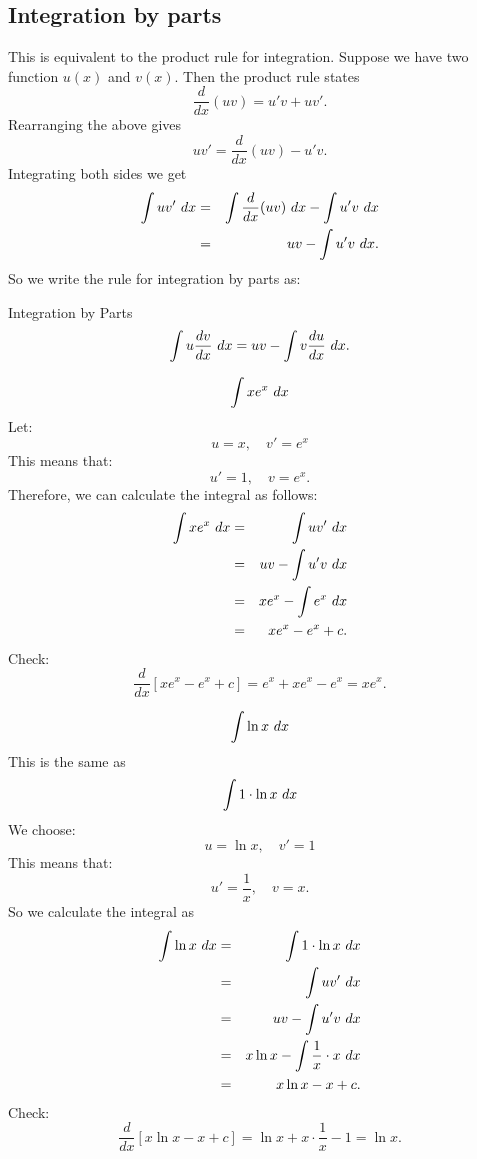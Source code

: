 \subsection{Integration by parts}
This is equivalent to the product rule for integration. Suppose we have two function $u(x)$ and $v(x)$. Then the product rule states
\[\frac{d}{dx}(uv)=u'v+uv'.\]
Rearranging the above gives
\[uv'=\frac{d}{dx}(uv)-u'v.\]
Integrating both sides we get
\begin{eqnarray*}
\int uv'\ dx &=& \int\frac{d}{dx}(uv)\ dx-\int u'v\ dx \\
&=& uv-\int u'v\ dx.
\end{eqnarray*}
So we write the rule for integration by parts as:
\begin{thing}{Integration by Parts}
\begin{equation*}
\int u\frac{dv}{dx}\ dx=uv-\int v\frac{du}{dx}\ dx.
\end{equation*}
\end{thing}

\begin{example}
\[\int xe^x\ dx\]
Let: 
\[u=x,\quad v'=e^x\]This means that:\[ u'=1,\quad v=e^x.\]
Therefore, we can calculate the integral as follows:
\begin{eqnarray*}
\int xe^x\ dx &=& \int uv'\ dx \\
&=&uv-\int u'v\ dx \\
&=& xe^x-\int e^x\ dx \\
&=& xe^x-e^x + c.
\end{eqnarray*}
Check:
\[\frac{d}{dx}\left[xe^x-e^x + c\right]=e^x+xe^x-e^x=xe^x.\]
\end{example}

\begin{example}
\[\int\ln x\ dx\]
This is the same as
\[\int1\cdot\ln x\ dx\]
We choose:
\[u=\ln x,\quad v'=1\]This means that: \[u'=\frac{1}{x},\quad v=x.\]
So we calculate the integral as
\begin{eqnarray*}
\int\ln x\ dx &=& \int 1\cdot\ln x\ dx \\
&=& \int uv'\ dx \\
&=& uv- \int u'v\ dx \\
&=& x\ln x-\int\frac{1}{x}\cdot x\ dx \\
&=& x\ln x- x+c.
\end{eqnarray*}
Check:
\[\frac{d}{dx}\left[x\ln x- x+c\right]=\ln x+x\cdot\frac{1}{x}-1=\ln x.\]
\end{example}

